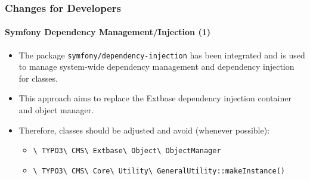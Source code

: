 \begin{frame}[fragile]
	\frametitle{Changes for Developers}
	\framesubtitle{Symfony Dependency Management/Injection (1)}

	\begin{itemize}
		\item The package \texttt{symfony/dependency-injection} has been integrated
			and is used to manage system-wide dependency management and dependency
			injection for classes.

		\item This approach aims to replace the Extbase dependency injection
			container and object manager.

		\item Therefore, classes should be adjusted and avoid (whenever possible):

			\begin{itemize}\small
				\item \texttt{\textbackslash
					TYPO3\textbackslash
					CMS\textbackslash
					Extbase\textbackslash
					Object\textbackslash
					ObjectManager}
				\item \texttt{\textbackslash
					TYPO3\textbackslash
					CMS\textbackslash
					Core\textbackslash
					Utility\textbackslash
					GeneralUtility::makeInstance()}
			\end{itemize}\normalsize

	\end{itemize}

\end{frame}


